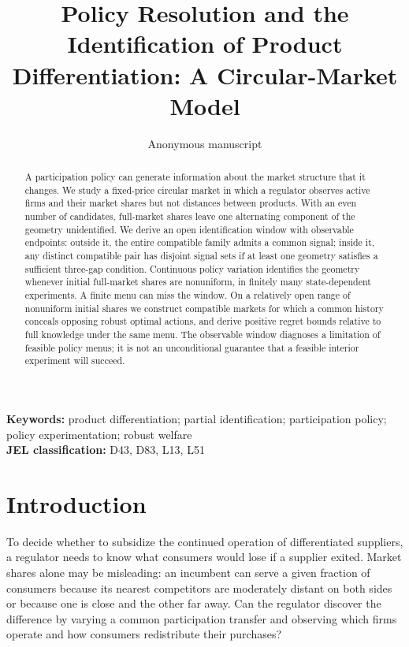 \documentclass[11pt]{article}
\title{Policy Resolution and the Identification of Product Differentiation: A Circular-Market Model}
\author{Anonymous manuscript}
\date{}
\begin{document}
\maketitle
\begin{abstract}
A participation policy can generate information about the market structure that it changes. We study a fixed-price circular market in which a regulator observes active firms and their market shares but not distances between products. With an even number of candidates, full-market shares leave one alternating component of the geometry unidentified. We derive an open identification window with observable endpoints: outside it, the entire compatible family admits a common signal; inside it, any distinct compatible pair has disjoint signal sets if at least one geometry satisfies a sufficient three-gap condition. Continuous policy variation identifies the geometry whenever initial full-market shares are nonuniform, in finitely many state-dependent experiments. A finite menu can miss the window. On a relatively open range of nonuniform initial shares we construct compatible markets for which a common history conceals opposing robust optimal actions, and derive positive regret bounds relative to full knowledge under the same menu. The observable window diagnoses a limitation of feasible policy menus; it is not an unconditional guarantee that a feasible interior experiment will succeed.
\end{abstract}
\noindent\textbf{Keywords:} product differentiation; partial identification; participation policy; policy experimentation; robust welfare\\
\textbf{JEL classification:} D43, D83, L13, L51

\section{Introduction}
To decide whether to subsidize the continued operation of differentiated suppliers, a regulator needs to know what consumers would lose if a supplier exited. Market shares alone may be misleading: an incumbent can serve a given fraction of consumers because its nearest competitors are moderately distant on both sides or because one is close and the other far away. Can the regulator discover the difference by varying a common participation transfer and observing which firms operate and how consumers redistribute their purchases?
\end{document}
